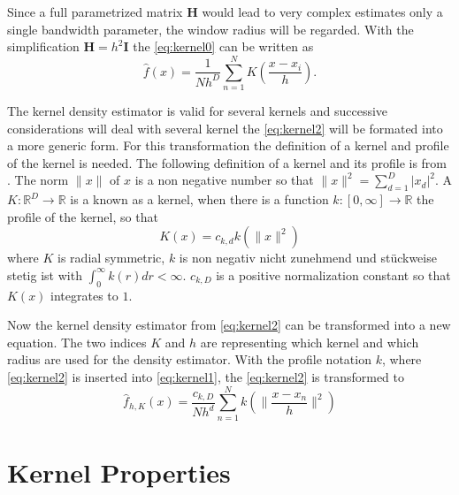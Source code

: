 Since a full parametrized matrix $\mathbf{H}$ would lead to very complex estimates
only a single bandwidth parameter, the window radius will be regarded. With the
simplification $\mathbf{H} = h^2 \mathbf{I}$ the \autoref{eq:kernel0} can be 
written as
\begin{equation}\label{eq:kernel2}
	\hat{f}(x) = \frac{1}{Nh^D}\sum_{n=1}^N K\left( \frac{x - x_i}{h} \right).
\end{equation}

The kernel density estimator is valid for several kernels and successive
considerations will deal with several kernel the \autoref{eq:kernel2} will be
formated into a more generic form. For this transformation the definition of a
kernel and profile of the kernel is needed. The following definition of a kernel
and its profile is from \citeauthor{citeulike:2522867}
\citep{citeulike:2522867}. The norm $\lVert x \rVert$ of $x$ is a non negative number 
so that $\lVert x \rVert^2 = \sum_{d = 1}^D|x_d|^2$.
A $K:\mathbb{R}^D \rightarrow \mathbb{R}$ is
a known as a kernel, when there is a function $k:[0, \infty] \rightarrow \mathbb{R}$ the profile
of the kernel, so that
\begin{equation}\label{eq:kernel3}
	K(x)=c_{k,d}k(\lVert x \rVert^2)
\end{equation}
where $K$ is radial symmetric, $k$ is non negativ {\color{iRed} nicht zunehmend
und stückweise stetig ist} with $\int_0^{\infty} k(r) dr < \infty$. $c_{k,D}$ is
a positive normalization constant so that $K(x)$ integrates to $1$. 

Now the kernel density estimator from \autoref{eq:kernel2} can be transformed into
a new equation. The two indices $K$ and $h$ are representing which kernel and 
which radius are used for the density estimator. With the profile notation $k$, where
\autoref{eq:kernel2} is inserted into \autoref{eq:kernel1}, the \autoref{eq:kernel2}
is transformed to
\begin{equation}\label{eq:kernel4}
	\hat{f}_{h,K}(x) = \frac{c_{k,D}}{Nh^d}\sum_{n = 1}^N k(\lVert \frac{x-x_n}{h} \rVert^2)
\end{equation}



\section{Kernel Properties} %
\label{sec:kernel_properties}








